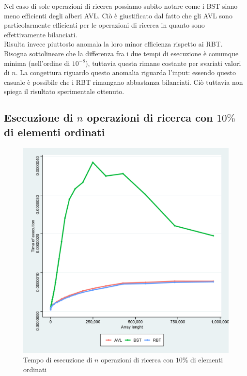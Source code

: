 \documentclass{article}
\begin{document}
	Nel caso di sole operazioni di ricerca possiamo subito notare come i BST siano meno efficienti degli alberi AVL. Ciò è giustificato dal fatto che gli AVL sono particolarmente efficienti per le operazioni di ricerca in quanto sono effettivamente bilanciati. \\
	Risulta invece piuttosto anomala la loro minor efficienza rispetto ai RBT. Bisogna sottolineare che la differenza fra i due tempi di esecuzione è comunque minima (nell'ordine di $10^{-8}$), tuttavia questa rimane costante per svariati valori di $n$. La congettura riguardo questo anomalia riguarda l'input: essendo questo casuale è possibile che i RBT rimangano abbastanza bilanciati. Ciò tuttavia non spiega il risultato sperimentale ottenuto.
	
	\newpage
	
	\subsection{Esecuzione di $n$ operazioni di ricerca con $10\%$ di elementi ordinati}
	\label{subsection:n_op_ric}
	
	\begin{figure}[h!]
		\centering
  		\includegraphics[width=1 \columnwidth]{Grafici/Grafico_All_find_ordered.png}
  		\caption{Tempo di esecuzione di $n$ operazioni di ricerca con $10\%$ di elementi ordinati}
  		\label{fig:graph4}
	\end{figure}
	
\end{document}
